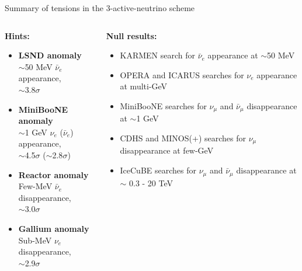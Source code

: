 \begin{frame}[t]{Summary of tensions in the 3-active-neutrino scheme}

\begin{columns}[t]
  \begin{column}{0.50\textwidth}
    {\bf \color{green}Hints:}\\
    \begin{itemize}
      \item {\bf LSND anomaly}\\
         $\sim$50 MeV $\bar{\nu}_{e}$ appearance,\\ $\sim$3.8$\sigma$
      \item {\bf MiniBooNE anomaly}\\
         $\sim$1 GeV $\nu_{e}$ ($\bar{\nu}_{e}$) appearance,\\ $\sim$4.5$\sigma$ ($\sim$2.8$\sigma$)
      \item {\bf Reactor anomaly}\\
         Few-MeV $\bar{\nu}_{e}$ disappearance,\\ $\sim$3.0$\sigma$
      \item {\bf Gallium anomaly}\\
         Sub-MeV $\nu_{e}$ disappearance,\\ $\sim$2.9$\sigma$
    \end{itemize}
  \end{column}
  \begin{column}{0.50\textwidth}
    {\bf \color{red}Null results:}\\
    \begin{itemize}
      \item KARMEN search for $\bar{\nu}_{e}$ appearance at $\sim$50 MeV
      \item OPERA and ICARUS searches for ${\nu}_{e}$ appearance at multi-GeV
      \item MiniBooNE searches for $\nu_{\mu}$ and $\bar{\nu}_{\mu}$ disappearance at $\sim$1 GeV
      \item CDHS and MINOS(+) searches for $\nu_{\mu}$ disappearance at few-GeV
      \item IceCuBE searches for $\nu_{\mu}$ and $\bar{\nu}_{\mu}$ disappearance at $\sim$ 0.3 - 20 TeV
    \end{itemize}
  \end{column}
\end{columns}

\end{frame}


%
%
%


